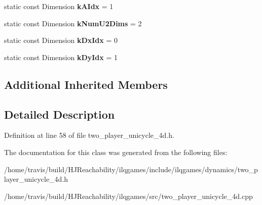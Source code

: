 \begin{DoxyCompactItemize}
\item 
static const Dimension {\bfseries k\+A\+Idx} = 1\hypertarget{classilqgames_1_1_two_player_unicycle4_d_a82fed104017f52f624c3e6be1c55e085}{}\label{classilqgames_1_1_two_player_unicycle4_d_a82fed104017f52f624c3e6be1c55e085}

\item 
static const Dimension {\bfseries k\+Num\+U2\+Dims} = 2\hypertarget{classilqgames_1_1_two_player_unicycle4_d_acf1437a363dec1655d8a1348bde87f02}{}\label{classilqgames_1_1_two_player_unicycle4_d_acf1437a363dec1655d8a1348bde87f02}

\item 
static const Dimension {\bfseries k\+Dx\+Idx} = 0\hypertarget{classilqgames_1_1_two_player_unicycle4_d_a0b77f8c6ca8feea8dda814cdb2656f41}{}\label{classilqgames_1_1_two_player_unicycle4_d_a0b77f8c6ca8feea8dda814cdb2656f41}

\item 
static const Dimension {\bfseries k\+Dy\+Idx} = 1\hypertarget{classilqgames_1_1_two_player_unicycle4_d_afc8cf8ab0ea396bc5c407a8fe459ac2e}{}\label{classilqgames_1_1_two_player_unicycle4_d_afc8cf8ab0ea396bc5c407a8fe459ac2e}

\end{DoxyCompactItemize}
\subsection*{Additional Inherited Members}


\subsection{Detailed Description}


Definition at line 58 of file two\+\_\+player\+\_\+unicycle\+\_\+4d.\+h.



The documentation for this class was generated from the following files\+:\begin{DoxyCompactItemize}
\item 
/home/travis/build/\+H\+J\+Reachability/ilqgames/include/ilqgames/dynamics/two\+\_\+player\+\_\+unicycle\+\_\+4d.\+h\item 
/home/travis/build/\+H\+J\+Reachability/ilqgames/src/two\+\_\+player\+\_\+unicycle\+\_\+4d.\+cpp\end{DoxyCompactItemize}
